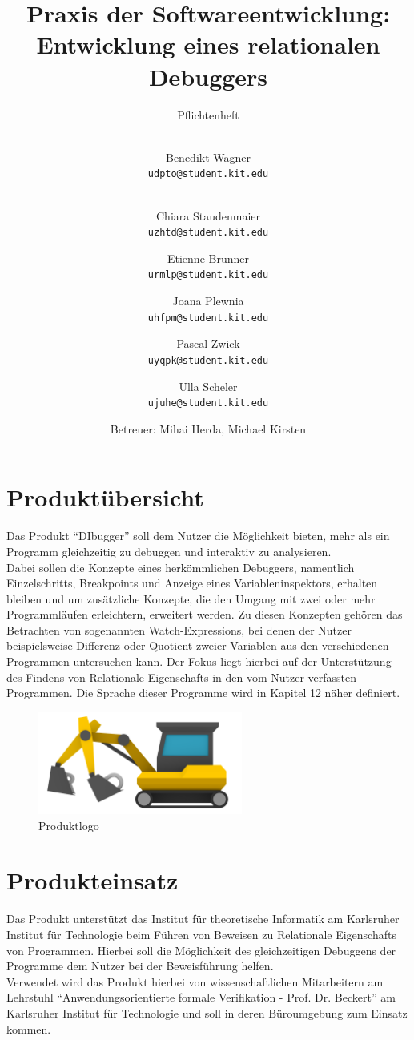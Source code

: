 \documentclass[parskip=full]{scrartcl}
\title{
	\vspace{2cm}
	\myfont 
	Praxis der Softwareentwicklung:\\ 
	Entwicklung eines relationalen Debuggers\\
}
\subtitle{
	\vspace{1cm}
	\myfont
	Pflichtenheft
}
\author{
	\vspace{1cm} \\
	Benedikt Wagner\\
	\texttt{udpto@student.kit.edu}
	\and \vspace{1cm} \\ Chiara Staudenmaier\\
	\texttt{uzhtd@student.kit.edu}
	\and Etienne Brunner\\
	\texttt{urmlp@student.kit.edu}
	\and Joana Plewnia\\
	\texttt{uhfpm@student.kit.edu} 
	\and Pascal Zwick\\
	\texttt{uyqpk@student.kit.edu}
	\and Ulla Scheler\\
	\texttt{ujuhe@student.kit.edu}
	\vspace{1cm}
	\and Betreuer: Mihai Herda, Michael Kirsten
	\vspace{4cm}
}
\begin{document}
\clearpage
\maketitle
{}
\newpage

\tableofcontents
\newpage
{}
\section{Produktübersicht}
Das Produkt \enquote{DIbugger} soll dem Nutzer die Möglichkeit bieten, mehr als ein Programm gleichzeitig zu debuggen und interaktiv zu analysieren. \\
Dabei sollen die Konzepte eines herkömmlichen Debuggers, namentlich \glspl{Einzelschritt}, \glspl{Breakpoint} und Anzeige eines \glspl{Variableninspektor}, erhalten bleiben und um zusätzliche Konzepte, die den Umgang mit zwei oder mehr Programmläufen erleichtern, erweitert werden. Zu diesen Konzepten gehören das Betrachten von sogenannten \glspl{Watch-Expression}, bei denen der Nutzer beispielsweise Differenz oder Quotient zweier Variablen aus den verschiedenen Programmen untersuchen kann. Der Fokus liegt hierbei auf der Unterstützung des Findens von \glspl{Relationale Eigenschaft} in den vom Nutzer verfassten Programmen.
Die Sprache dieser Programme wird in Kapitel 12 näher definiert.
\vspace{0.7cm}
\begin{figure}[!h]
\centering
\includegraphics[width=0.6\textwidth]{logo_nongi.png}
\caption{Produktlogo}
\end{figure}

\section{Produkteinsatz}
Das Produkt unterstützt das Institut für theoretische Informatik am Karlsruher Institut für Technologie beim Führen von Beweisen zu \glspl{Relationale Eigenschaft} von Programmen. Hierbei soll die Möglichkeit des gleichzeitigen Debuggens der Programme dem Nutzer bei der Beweisführung helfen. \\
Verwendet wird das Produkt hierbei von wissenschaftlichen Mitarbeitern am Lehrstuhl \enquote{Anwendungsorientierte formale Verifikation - Prof. Dr. Beckert} am Karlsruher Institut für Technologie und soll in deren Büroumgebung zum Einsatz kommen. 
\end{document}
